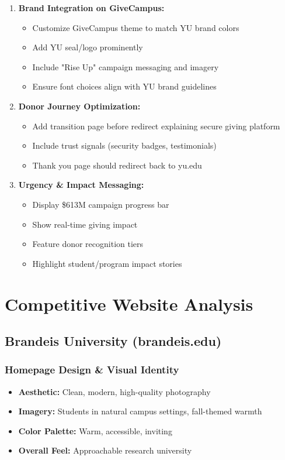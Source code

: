 \documentclass[12pt,letterpaper]{article}
\begin{document}
\begin{enumerate}[leftmargin=*]
    \item \textbf{Brand Integration on GiveCampus:}
    \begin{itemize}
        \item Customize GiveCampus theme to match YU brand colors
        \item Add YU seal/logo prominently
        \item Include "Rise Up" campaign messaging and imagery
        \item Ensure font choices align with YU brand guidelines
    \end{itemize}

    \item \textbf{Donor Journey Optimization:}
    \begin{itemize}
        \item Add transition page before redirect explaining secure giving platform
        \item Include trust signals (security badges, testimonials)
        \item Thank you page should redirect back to yu.edu
    \end{itemize}

    \item \textbf{Urgency \& Impact Messaging:}
    \begin{itemize}
        \item Display \$613M campaign progress bar
        \item Show real-time giving impact
        \item Feature donor recognition tiers
        \item Highlight student/program impact stories
    \end{itemize}
\end{enumerate}

\section{Competitive Website Analysis}

\subsection{Brandeis University (brandeis.edu)}

\subsubsection{Homepage Design \& Visual Identity}
\begin{itemize}[leftmargin=*]
    \item \textbf{Aesthetic:} Clean, modern, high-quality photography
    \item \textbf{Imagery:} Students in natural campus settings, fall-themed warmth
    \item \textbf{Color Palette:} Warm, accessible, inviting
    \item \textbf{Overall Feel:} Approachable research university
\end{itemize}
\end{document}
